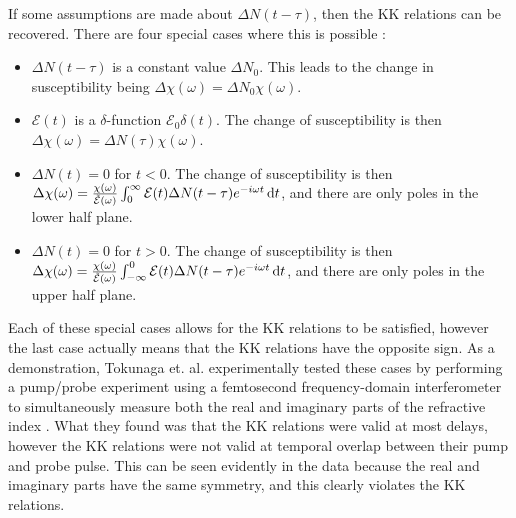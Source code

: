 If some assumptions are made about $\Delta N(t-\tau)$, then the KK relations can be recovered. There are four special cases where this is possible \cite{tokunagaFemtosecondTimeresolvedDispersion1993, tokunagaFemtosecondContinuumInterferometer1996}:
\begin{itemize}
	\item $\Delta N(t-\tau)$ is a constant value $\Delta N_0$.  This leads to the change in susceptibility being $\Delta\chi(\omega) = \Delta N_0 \chi(\omega)$. 
	\item $\mathcal{E}(t)$ is a $\delta$-function $\mathcal{E}_0\delta(t)$.  The change of susceptibility is then $\Delta\chi(\omega) = \Delta N (\tau)\chi(\omega)$.
	\item $\Delta N(t)=0$ for $t<0$.  The change of susceptibility is then $\Delta\chi(\omega) = \frac{\chi(\omega)}{\tilde{\mathcal{E}}(\omega)}\int_{0}^{\infty}\mathcal{E}(t)\Delta N (t-\tau) e^{-i\omega t }\mathop{}\!\mathrm{d} t$, and there are only poles in the lower half plane.
	\item $\Delta N(t)=0$ for $t>0$.  The change of susceptibility is then $\Delta\chi(\omega) = \frac{\chi(\omega)}{\tilde{\mathcal{E}}(\omega)}\int_{-\infty}^{0}\mathcal{E}(t)\Delta N (t-\tau) e^{-i\omega t }\mathop{}\!\mathrm{d} t$, and there are only poles in the upper half plane.
\end{itemize}
Each of these special cases allows for the KK relations to be satisfied, however the last case actually means that the KK relations have the opposite sign.  As a demonstration, Tokunaga et. al. experimentally tested these cases by performing a pump/probe experiment using a femtosecond frequency-domain interferometer to simultaneously measure both the real and imaginary parts of the refractive index \cite{tokunagaFemtosecondTimeresolvedDispersion1993}.  What they found was that the KK relations were valid at most delays, however the KK relations were not valid at temporal overlap between their pump and probe pulse.  This can be seen evidently in the data because the real and imaginary parts have the same symmetry, and this clearly violates the KK relations.

